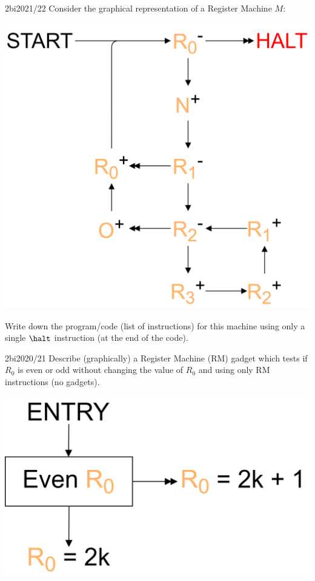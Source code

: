 \begin{exambox}{2bi}{2021/22}
	Consider the graphical representation of a Register Machine $M$:
	\begin{center}
		\includegraphics[width=.4\textwidth]{register_machines/images/exam_2bi_2021_2022.drawio.png}
	\end{center}
	Write down the program/code (list of instructions) for this machine using only a single $\halt$ instruction (at the end of the code).
\end{exambox}

\begin{exambox}{2bi}{2020/21}
	Describe (graphically) a Register Machine (RM) gadget which tests if $R_0$ is
	even or odd without changing the value of $R_0$ and using only RM
	instructions (no gadgets).
	\begin{center}
		\includegraphics[width=.5\textwidth]{register_machines/images/exam_2bi_2020_2021.drawio.png}
	\end{center}
\end{exambox}

